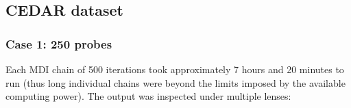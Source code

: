 \documentclass[14pt]{extarticle} %
\begin{document}

	\subsection{CEDAR dataset} \label{sec:results:cedar}
	\subsubsection{Case 1: 250 probes} \label{sec:results:cedar:dataset_1}
	
	Each MDI chain of 500 iterations took approximately 7 hours and 20 minutes to run (thus long individual chains were beyond the limits imposed by the available computing power). The output was inspected under multiple lenses: 
	
\end{document}
